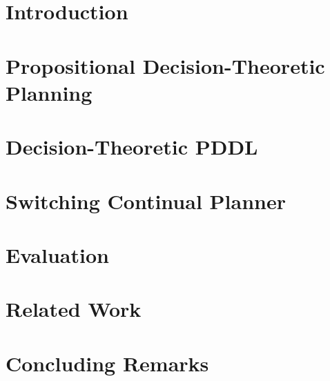 \documentclass[letterpaper]{article}
\begin{document}


\section{Introduction}


\section{Propositional Decision-Theoretic Planning}


\section{Decision-Theoretic PDDL}


\section{Switching Continual Planner}


\section{Evaluation}



\section{Related Work}


\section{Concluding Remarks}





\end{document}
